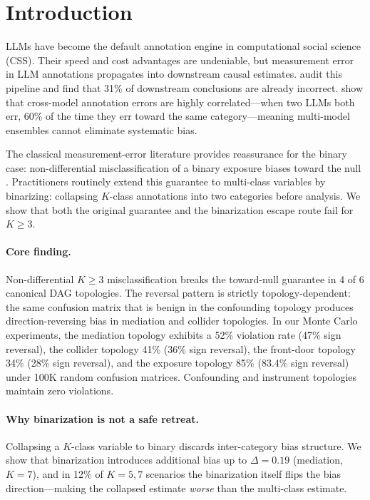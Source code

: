 \documentclass[11pt]{article}
\begin{document}
\section{Introduction}
\label{sec:intro}

LLMs have become the default annotation engine in computational social science (CSS).
Their speed and cost advantages are undeniable, but measurement error in LLM annotations propagates into downstream causal estimates.
\citet{baumann2025} audit this pipeline and find that 31\% of downstream conclusions are already incorrect.
\citet{kim2025} show that cross-model annotation errors are highly correlated---when two LLMs both err, 60\% of the time they err toward the same category---meaning multi-model ensembles cannot eliminate systematic bias.

The classical measurement-error literature provides reassurance for the binary case: non-differential misclassification of a binary exposure biases toward the null \citep{bross1954}.
Practitioners routinely extend this guarantee to multi-class variables by binarizing: collapsing $K$-class annotations into two categories before analysis.
We show that both the original guarantee and the binarization escape route fail for $K\!\ge\!3$.

\paragraph{Core finding.}
Non-differential $K\!\ge\!3$ misclassification breaks the toward-null guarantee in 4 of 6 canonical DAG topologies.
The reversal pattern is strictly topology-dependent: the same confusion matrix that is benign in the confounding topology produces direction-reversing bias in mediation and collider topologies.
In our Monte Carlo experiments, the mediation topology exhibits a 52\% violation rate (47\% sign reversal), the collider topology 41\% (36\% sign reversal), the front-door topology 34\% (28\% sign reversal), and the exposure topology 85\% (83.4\% sign reversal) under 100K random confusion matrices.
Confounding and instrument topologies maintain zero violations.

\paragraph{Why binarization is not a safe retreat.}
Collapsing a $K$-class variable to binary discards inter-category bias structure.
We show that binarization introduces additional bias up to $\Delta\!=\!0.19$ (mediation, $K\!=\!7$), and in 12\% of $K\!=\!5{,}7$ scenarios the binarization itself flips the bias direction---making the collapsed estimate \emph{worse} than the multi-class estimate.
\end{document}
